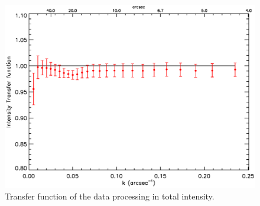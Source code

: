 \documentclass[twocolumn,traditabstract]{aa}
\begin{document}
\begin{figure}[h!]
  \centering
  \includegraphics[width=0.7\linewidth,keepaspectratio]{figures/Crab_transfer_func.eps}
	\caption{Transfer function of the data processing in total intensity.}
\label{transfer_func}
\end{figure}
  
\end{document}
